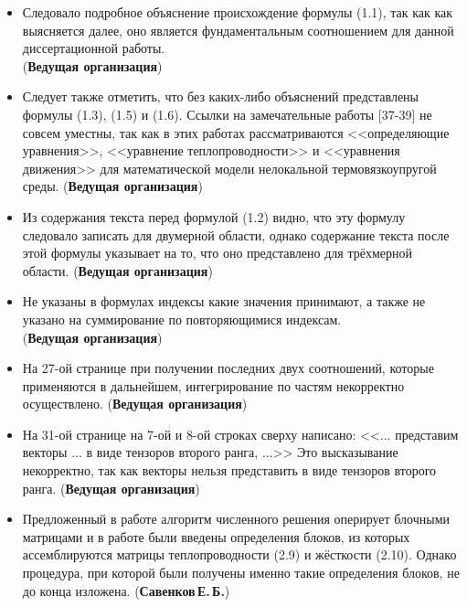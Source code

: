 \begin{frame}
	\begin{itemize}
		\justifying
		\item Следовало подробное объяснение происхождение формулы (1.1), так как как выясняется далее, оно является фундаментальным соотношением для данной диссертационной работы. \\ (\textbf{Ведущая организация})
		\item Следует также отметить, что без каких-либо объяснений представлены формулы (1.3), (1.5) и (1.6). Ссылки на замечательные работы [37-39] не совсем уместны, так как в этих работах рассматриваются <<определяющие уравнения>>, <<уравнение теплопроводности>> и <<уравнения движения>> для математической модели нелокальной термовязкоупругой среды. (\textbf{Ведущая организация})
	\end{itemize}
\end{frame}

\begin{frame}
	\begin{itemize}
		\justifying
        \item Из содержания текста перед формулой (1.2) видно, что эту формулу следовало записать для двумерной области, однако содержание текста после этой формулы указывает на то, что оно представлено для трёхмерной области. (\textbf{Ведущая организация})
        \item Не указаны в формулах индексы какие значения принимают, а также не указано на суммирование по повторяющимися индексам. \\ (\textbf{Ведущая организация})
        \item На 27-ой странице при получении последних двух соотношений, которые применяются в дальнейшем, интегрирование по частям некорректно осуществлено. (\textbf{Ведущая организация})
        \item На 31-ой странице на 7-ой и 8-ой строках сверху написано: <<... представим векторы ... в виде тензоров второго ранга, ...>> Это высказывание некорректно, так как векторы нельзя представить в виде тензоров второго ранга. (\textbf{Ведущая организация})
        \item Предложенный в работе алгоритм численного решения оперирует блочными матрицами и в работе были введены определения блоков, из которых ассемблируются матрицы теплопроводности (2.9) и жёсткости (2.10). Однако процедура, при которой были получены именно такие определения блоков, не до конца изложена. (\textbf{Савенков\,Е.\,Б.})
	\end{itemize}
\end{frame}

